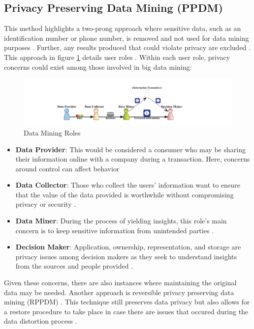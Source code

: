 \documentclass[sigconf]{acmart}
\begin{document}
\subsection{Privacy Preserving Data Mining (PPDM)} This method highlights a two-prong approach where sensitive data, such as an identification number or phone number, is removed and not used for data mining purposes \cite{Xu2014}. Further, any results produced that could violate privacy are excluded \cite{Xu2014}. This approach in figure \ref{f:Data Mining Roles} details user roles \cite{Xu2014}. Within each user role, privacy concerns could exist among those involved in big data mining:
\begin{figure}[!ht]
  \centering\includegraphics[width=\columnwidth]{roles.jpg}
  \caption{Data Mining Roles }\label{f:Data Mining Roles}
\end{figure}
\begin{itemize}
 \item \textbf{Data Provider}: This would be considered a consumer who may be sharing their information online with a company during a transaction. Here, concerns around control can affect behavior \cite{Xu2014}
 \item \textbf{Data Collector}: Those who collect the users' information want to ensure that the value of the data provided is worthwhile without compromising privacy or security \cite{Xu2014}.
 \item \textbf{Data Miner}: During the process of yielding insights, this role's main concern is to keep sensitive information from unintended parties \cite{Xu2014}. 
 \item \textbf{Decision Maker}: Application, ownership, representation, and storage are privacy issues among decision makers as they seek to understand insights from the sources and people provided \cite{Xu2014}. 
 \end{itemize}

Given these concerns, there are also instances where maintaining the original data may be needed. Another approach is reversible privacy preserving data mining (RPPDM) \cite{Chen2013}. This technique still preserves data privacy but also allows for a restore procedure to take place in case there are issues that occured during the data distortion process \cite{Chen2013}. 
\end{document}
